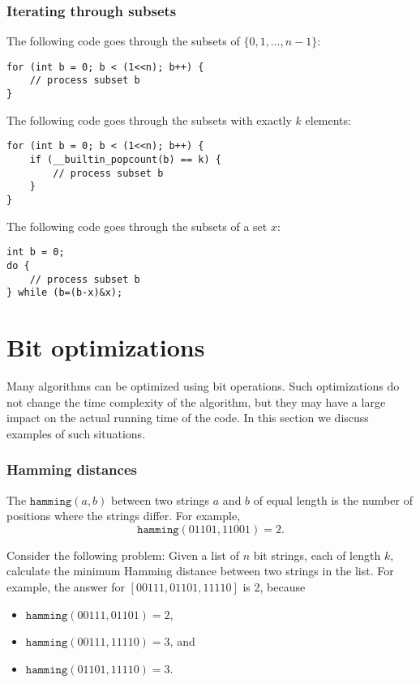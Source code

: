 \subsubsection{Iterating through subsets}

The following code goes through
the subsets of $\{0,1,\ldots,n-1\}$:

\begin{lstlisting}
for (int b = 0; b < (1<<n); b++) {
    // process subset b
}
\end{lstlisting}
The following code goes through
the subsets with exactly $k$ elements:
\begin{lstlisting}
for (int b = 0; b < (1<<n); b++) {
    if (__builtin_popcount(b) == k) {
        // process subset b
    }
}
\end{lstlisting}
The following code goes through the subsets
of a set $x$:
\begin{lstlisting}
int b = 0;
do {
    // process subset b
} while (b=(b-x)&x);
\end{lstlisting}

\section{Bit optimizations}

Many algorithms can be optimized using
bit operations.
Such optimizations do not change the
time complexity of the algorithm,
but they may have a large impact
on the actual running time of the code.
In this section we discuss examples
of such situations.

\subsubsection{Hamming distances}

The 
$\texttt{hamming}(a,b)$ between two
strings $a$ and $b$ of equal length is
the number of positions where the strings differ.
For example,
\[\texttt{hamming}(01101,11001)=2.\]

Consider the following problem: Given
a list of $n$ bit strings, each of length $k$,
calculate the minimum Hamming distance
between two strings in the list.
For example, the answer for $[00111,01101,11110]$
is 2, because
\begin{itemize}[noitemsep]
\item $\texttt{hamming}(00111,01101)=2$,
\item $\texttt{hamming}(00111,11110)=3$, and
\item $\texttt{hamming}(01101,11110)=3$.
\end{itemize}

